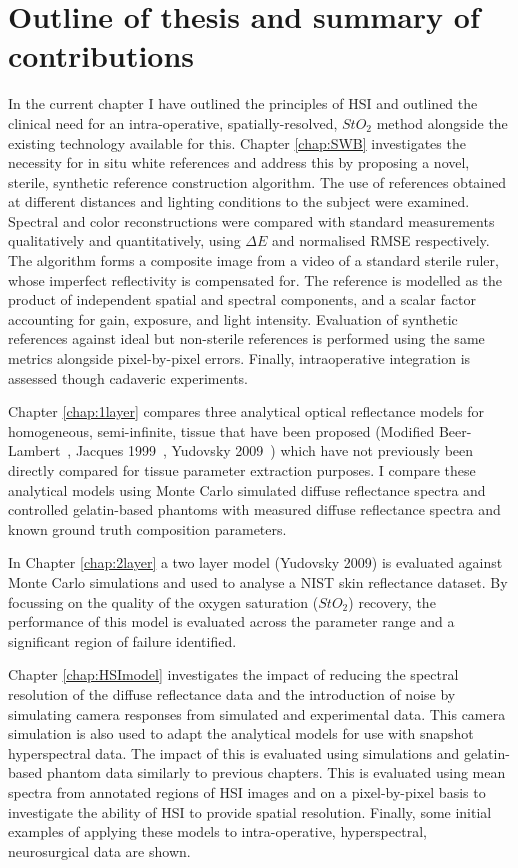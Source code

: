 \section{Outline of thesis and summary of contributions}\label{sec:thesisoutline}
In the current chapter I have outlined the principles of HSI and outlined the clinical need for an intra-operative, spatially-resolved, $StO_2$ method alongside the existing technology available for this. 
Chapter \ref{chap:SWB} investigates the necessity for in situ white references and address this by proposing a novel, sterile, synthetic reference construction algorithm. The use of references obtained at different distances and lighting conditions to the subject were examined. Spectral and color reconstructions were compared with standard measurements qualitatively and quantitatively, using $\Delta E$ and normalised RMSE respectively. The algorithm forms a composite image from a video of a standard sterile ruler, whose imperfect reflectivity is compensated for. The reference is modelled as the product of independent spatial and spectral components, and a scalar factor accounting for gain, exposure, and light intensity. Evaluation of synthetic references against ideal but non-sterile references is performed using the same metrics alongside pixel-by-pixel errors. Finally, intraoperative integration is assessed though cadaveric experiments.

Chapter \ref{chap:1layer} compares three analytical optical reflectance models for homogeneous, semi-infinite, tissue that have been proposed (Modified Beer-Lambert~\cite{Clancy2015}, Jacques 1999~\cite{Jacques1999}, Yudovsky 2009~\cite{Yudovsky2009}) which have not previously been directly compared for tissue parameter extraction purposes. I compare these analytical models using Monte Carlo simulated diffuse reflectance spectra and controlled gelatin-based phantoms with measured diffuse reflectance spectra and known ground truth composition parameters. 

In Chapter \ref{chap:2layer} a two layer model (Yudovsky 2009) is evaluated against Monte Carlo simulations and used to analyse a NIST skin reflectance dataset. By focussing on the quality of the oxygen saturation ($StO_2$) recovery, the performance of this model is evaluated across the parameter range and a significant region of failure identified. 

Chapter \ref{chap:HSImodel} investigates the impact of reducing the spectral resolution of the diffuse reflectance data and the introduction of noise by simulating camera responses from simulated and experimental data. This camera simulation is also used to adapt the analytical models for use with snapshot hyperspectral data. The impact of this is evaluated using simulations and gelatin-based phantom data similarly to previous chapters. This is evaluated using mean spectra from annotated regions of HSI images and on a pixel-by-pixel basis to investigate the ability of HSI to provide spatial resolution. Finally, some initial examples of applying these models to intra-operative, hyperspectral, neurosurgical data are shown. 